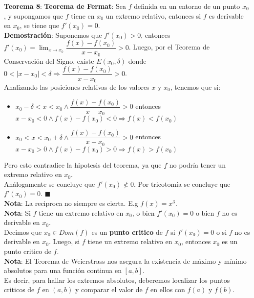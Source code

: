 \documentclass[11pt,a4paper]{article}
\newcommand*{\QEDA}{\null\nobreak\hfill\ensuremath{\blacksquare}}
\begin{document}
\noindent \textbf{Teorema 8}: \textbf{Teorema de Fermat}:
Sea $f$ definida en un entorno de un punto $x_0$, y supongamos que $f$ tiene en $x_0$ un extremo relativo, entonces si $f$ es derivable en $x_0$, se tiene que $f'(x_0)=0$.\\
\textbf{Demostraci\'on}: Suponemos que $f'(x_0) > 0$, entonces $f'(x_0) = \displaystyle{\lim_{x \to x_0} \dfrac{f(x)-f(x_0)}{x-x_0} > 0}$. Luego, por el Teorema de Conservaci\'on del Signo, existe $E(x_0, \delta)$ donde $0<|x-x_0|<\delta \Rightarrow \dfrac{f(x)-f(x_0)}{x-x_0} > 0$.\\
Analizando las posiciones relativas de los valores $x$ y $x_0$, tenemos que si:
\begin{itemize}
\item $x_0 - \delta < x < x_0 \land \dfrac{f(x)-f(x_0)}{x-x_0} > 0$ entonces $x-x_0 < 0 \land f(x)-f(x_0)<0 \Rightarrow f(x)<f(x_0)$
\item $x_0 < x < x_0 + \delta \land \dfrac{f(x)-f(x_0)}{x-x_0} > 0$ entonces $x-x_0 > 0 \land f(x)-f(x_0)>0 \Rightarrow f(x)>f(x_0)$
\end{itemize}
Pero esto contradice la hipotesis del teorema, ya que $f$ no podr\'ia tener un extremo relativo en $x_0$.\\
An\'alogamente se concluye que $f'(x_0) \not < 0$. Por tricotom\'ia se concluye que $f'(x_0) = 0$. \QEDA\\

\noindent \textbf{Nota}: La reciproca no siempre es cierta. E.g $f(x)=x^3$.\\
\textbf{Nota}: Si $f$ tiene un extremo relativo en $x_0$, o bien $f'(x_0)=0$ o bien $f$ no es derivable en $x_0$.\\

\noindent Decimos que $x_0 \in Dom(f)$ es un \textbf{punto critico} de $f$ si $f'(x_0)=0$ o si $f$ no es derivable en $x_0$. Luego, si $f$ tiene un extremo relativo en $x_0$, entonces $x_0$ es un punto critico de $f$.\\

\noindent\textbf{Nota}: El Teorema de Weierstrass nos asegura la existencia de m\'aximo y m\'inimo absolutos para una funci\'on continua en $[a,b]$.\\

Es decir, para hallar los extremos absolutos, deberemos localizar los puntos criticos de $f$ en $(a,b)$ y comparar el valor de $f$ en ellos con $f(a)$ y $f(b)$.
\end{document}

